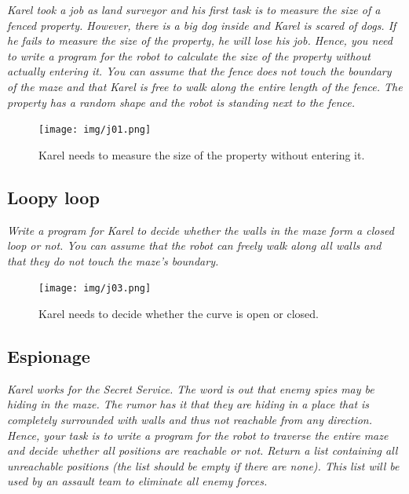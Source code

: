 \noindent
{\em Karel took a job as land surveyor and his first task is to measure the size of a fenced property. However, there is a big dog inside and Karel is scared of dogs. If he fails to measure the size of the property, he will lose his job. Hence, you need to write a program for the robot to calculate the size of the property without actually entering it. You can assume that the fence does not touch the boundary of the maze and that Karel is free to walk along the entire length of the fence. The property has a random shape and the robot is standing next to the fence.}

\begin{figure}[!ht]
\begin{center}
\texttt{[image: img/j01.png]}
\end{center}
\vspace{-4mm}
\caption{Karel needs to measure the size of the property without entering it.}
\label{fig:j01}
\end{figure}

\newpage
\subsection{Loopy loop}

\noindent
{\em Write a program for Karel to decide whether the walls in the maze form a closed loop or not. You can assume that the robot can freely walk along all walls and that they do not touch the maze's boundary.  }

\begin{figure}[!ht]
\begin{center}
\texttt{[image: img/j03.png]}
\end{center}
\vspace{-4mm}
\caption{Karel needs to decide whether the curve is open or closed.}
\label{fig:j03}
\end{figure}


\newpage
\subsection{Espionage}

\noindent
{\em Karel works for the Secret Service. The word is out that 
enemy spies may be hiding in the maze. The rumor has it that they are 
hiding in a place that is completely surrounded with walls and thus 
not reachable from any direction. Hence, your task is to write a program 
for the robot to traverse the entire maze and decide whether all positions 
are reachable or not. Return a list containing all unreachable positions 
(the list should be empty if there are none). This list will be used by 
an assault team to eliminate all enemy forces.}

